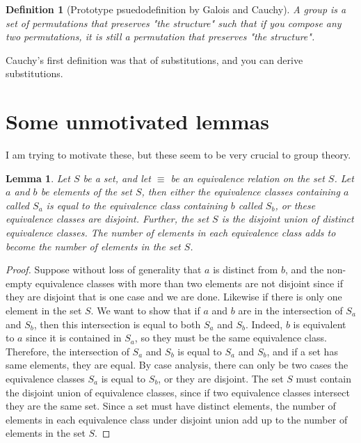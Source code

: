 \documentclass{tufte-book}
\newtheorem{definition}[theorem]{Definition}
\newtheorem{lemma}[theorem]{Lemma}
\begin{document}
\begin{definition}[Prototype psuedodefinition by Galois and Cauchy]
A group is a set of permutations that preserves "the structure" such that if you compose any two permutations, it is still a permutation that preserves "the structure".
\end{definition}

Cauchy's first definition was that of substitutions, and you can derive substitutions. 

\section{Some unmotivated lemmas}

I am trying to motivate these, but these seem to be very crucial to group theory.

\begin{lemma}
  Let $S$ be a set, and let $\equiv$ be an equivalence relation on the set $S$.
  Let $a$ and $b$ be elements of the set $S$, then either 
  the equivalence classes containing $a$ called $S_{a}$ is equal to the 
  equivalence class containing $b$ called $S_{b}$, or these equivalence classes are disjoint.
  Further, the set $S$ is the disjoint union of distinct equivalence classes.
  The number of elements in each equivalence class adds to become the number of elements in the set $S$.
\end{lemma}

\begin{proof}
  Suppose without loss of generality that $a$ is distinct from $b$, and the non-empty equivalence classes
  with more than two elements are not disjoint since if they are disjoint that is one case and we are done.
  Likewise if there is only one element in the set $S$.
  We want to show that if $a$ and $b$ are in the intersection of $S_{a}$ and $S_{b}$, then this intersection is equal to
  both $S_a$ and $S_b$. Indeed, $b$ is equivalent to $a$ since it is contained in $S_a$, so they must be the same equivalence class.
  Therefore, the intersection of $S_{a}$ and $S_{b}$ is equal to $S_a$ and $S_b$, and if a set has same elements, they are equal.
  By case analysis, there can only be two cases the equivalence classes $S_a$ is equal to $S_b$, or they are disjoint.
  The set $S$ must contain the disjoint union of equivalence classes, since if two equivalence classes intersect they are the same set.
  Since a set must have distinct elements, the number of elements in each equivalence class under disjoint union add up to the number of elements in the set $S$.
\end{proof}
\end{document}
